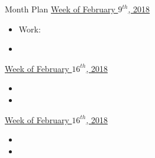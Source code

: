 \begin{columns}
\begin{column}{0.10\linewidth}
\begin{block}{Month Plan}
\underline{Week of February $9^{th}$, 2018}
\begin{itemize}
\tiny \item \tiny Work: 
\item \tiny
\end{itemize}

\underline{Week of February $16^{th}$, 2018}
\begin{itemize}
\tiny \item \tiny 
\item \tiny
\end{itemize}

\underline{Week of February $16^{th}$, 2018}
\begin{itemize}
\tiny \item \tiny 
\item \tiny
\end{itemize}

\end{block}


\end{column}
\end{columns}
